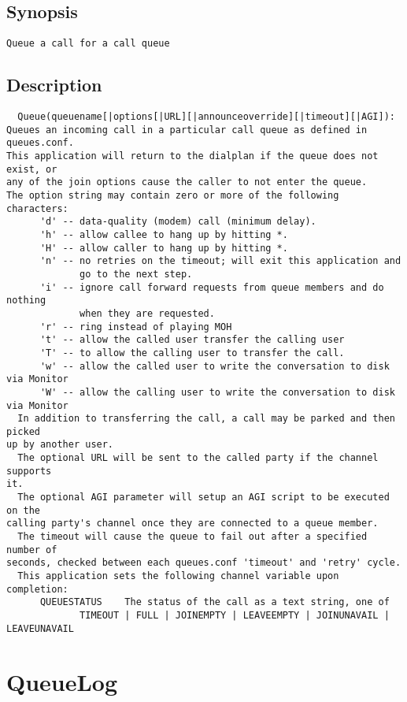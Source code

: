 \subsection{Synopsis}
\begin{verbatim}
Queue a call for a call queue
\end{verbatim}
\subsection{Description}
\begin{verbatim}
  Queue(queuename[|options[|URL][|announceoverride][|timeout][|AGI]):
Queues an incoming call in a particular call queue as defined in queues.conf.
This application will return to the dialplan if the queue does not exist, or
any of the join options cause the caller to not enter the queue.
The option string may contain zero or more of the following characters:
      'd' -- data-quality (modem) call (minimum delay).
      'h' -- allow callee to hang up by hitting *.
      'H' -- allow caller to hang up by hitting *.
      'n' -- no retries on the timeout; will exit this application and 
             go to the next step.
      'i' -- ignore call forward requests from queue members and do nothing
             when they are requested.
      'r' -- ring instead of playing MOH
      't' -- allow the called user transfer the calling user
      'T' -- to allow the calling user to transfer the call.
      'w' -- allow the called user to write the conversation to disk via Monitor
      'W' -- allow the calling user to write the conversation to disk via Monitor
  In addition to transferring the call, a call may be parked and then picked
up by another user.
  The optional URL will be sent to the called party if the channel supports
it.
  The optional AGI parameter will setup an AGI script to be executed on the 
calling party's channel once they are connected to a queue member.
  The timeout will cause the queue to fail out after a specified number of
seconds, checked between each queues.conf 'timeout' and 'retry' cycle.
  This application sets the following channel variable upon completion:
      QUEUESTATUS    The status of the call as a text string, one of
             TIMEOUT | FULL | JOINEMPTY | LEAVEEMPTY | JOINUNAVAIL | LEAVEUNAVAIL

\end{verbatim}


\section{QueueLog}
